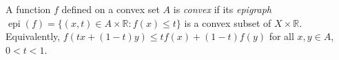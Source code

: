 A function $f$ defined on a convex set $A$ is \emph{convex} if its \emph{epigraph} $\operatorname{epi}(f) = \{(x,t) \in A \times \mathbb{R} : f(x) \leqslant t\}$ is a convex subset of $X \times \mathbb{R}$. Equivalently, $f(tx+(1-t)y) \leqslant tf(x) + (1-t)f(y)$ for all $x,y \in A$, $0 < t < 1$.
